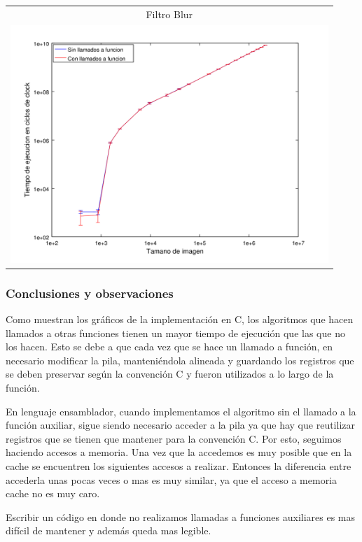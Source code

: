 				{\centering \begin{tabular}{c}
		      		{\small Filtro Blur} \\
		      		\includegraphics[width=12cm]{../exp/graficos/exp4-blur-asm_vs_asm2.png} \\
		    	\end{tabular}}

			\subsubsection*{Conclusiones y observaciones}		

				Como muestran los gráficos de la implementación en C, los algoritmos que hacen llamados a otras funciones tienen un mayor tiempo de ejecución que las que no los hacen. Esto se debe a que cada vez que se hace un llamado a función, en necesario modificar la pila, manteniéndola alineada y guardando los registros que se deben preservar según la convención C y fueron utilizados a lo largo de la función.

				En lenguaje ensamblador, cuando implementamos el algoritmo sin el llamado a la función auxiliar, sigue siendo necesario acceder a la pila ya que hay que reutilizar registros que se tienen que mantener para la convención C. Por esto, seguimos haciendo accesos a memoria. Una vez que la accedemos es muy posible que en la cache se encuentren los siguientes accesos a realizar. Entonces la diferencia entre accederla unas pocas veces o mas es muy similar, ya que el acceso a memoria cache no es muy caro.

				Escribir un código en donde no realizamos llamadas a funciones auxiliares es mas difícil de mantener y además queda mas legible.
